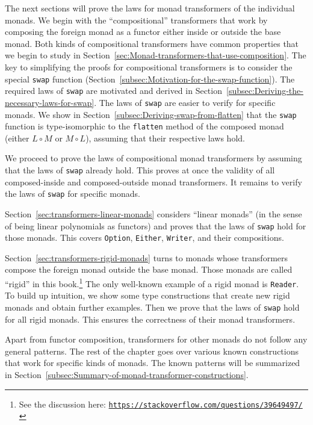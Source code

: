 The next sections will prove the laws for monad transformers of the
individual monads. We begin with the \textsf{``}compositional\textsf{''} transformers
that work by composing the foreign monad as a functor either inside
or outside the base monad. Both kinds of compositional transformers
have common properties that we begin to study in Section~\ref{sec:Monad-transformers-that-use-composition}.
The key to simplifying the proofs for compositional transformers is
to consider the special \lstinline!swap! function (Section~\ref{subsec:Motivation-for-the-swap-function}).
The required laws of \lstinline!swap! are motivated and derived in
Section~\ref{subsec:Deriving-the-necessary-laws-for-swap}. The laws
of \lstinline!swap! are easier to verify for specific monads. We
show in Section~\ref{subsec:Deriving-swap-from-flatten} that the
\lstinline!swap! function is type-isomorphic to the \lstinline!flatten!
method of the composed monad (either $L\circ M$ or $M\circ L$),
assuming that their respective laws hold. 

We proceed to prove the laws of compositional monad transformers by
assuming that the laws of \lstinline!swap! already hold. This proves
at once the validity of all composed-inside and composed-outside monad
transformers. It remains to verify the laws of \lstinline!swap! for
specific monads. 

Section~\ref{sec:transformers-linear-monads} considers \textsf{``}linear
monads\textsf{''} (in the sense of being linear polynomials as functors) and
proves that the laws of \lstinline!swap! hold for those monads. This
covers \lstinline!Option!, \lstinline!Either!, \lstinline!Writer!,
and their compositions.

Section~\ref{sec:transformers-rigid-monads} turns to monads whose
transformers compose the foreign monad outside the base monad. Those
monads are called \textsf{``}rigid\textsf{''} in this book.\footnote{See the discussion here: \texttt{\href{https://stackoverflow.com/questions/39649497/}{https://stackoverflow.com/questions/39649497/}}}
The only well-known example of a rigid monad is \lstinline!Reader!.
To build up intuition, we show some type constructions that create
new rigid monads and obtain further examples. Then we prove that the
laws of \lstinline!swap! hold for all rigid monads. This ensures
the correctness of their monad transformers.

Apart from functor composition, transformers for other monads do not
follow any general patterns. The rest of the chapter goes over various
known constructions that work for specific kinds of monads. The known
patterns will be summarized in Section~\ref{subsec:Summary-of-monad-transformer-constructions}.

